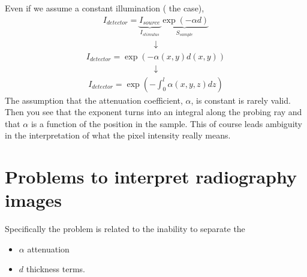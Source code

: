 \documentclass[letterpaper,10pt,english]{sphinxmanual}
\begin{document}
\sphinxAtStartPar
Even if we assume a constant illumination ( the case),
\begin{equation*}
\begin{split}I_{detector}=\underbrace{I_{source}}_{I_{stimulus}}\underbrace{\exp(-\alpha d)}_{S_{sample}}\end{split}
\end{equation*}\begin{equation*}
\begin{split}\downarrow\end{split}
\end{equation*}\begin{equation*}
\begin{split}I_{detector}=\exp(-\alpha(x,y) d(x,y))\end{split}
\end{equation*}\begin{equation*}
\begin{split}\downarrow\end{split}
\end{equation*}\begin{equation*}
\begin{split}I_{detector}=\exp\left(-\int_{0}^{l}\alpha(x,y, z) dz\right)\end{split}
\end{equation*}
\sphinxAtStartPar
The assumption that the attenuation coefficient, \(\alpha\), is constant is rarely valid. Then you see that the exponent turns into an integral along the probing ray and that \(\alpha\) is a function of the position in the sample. This of course leads ambiguity in the interpretation of what the pixel intensity really means.


\section{Problems to interpret radiography images}
\label{\detokenize{04-BasicSegmentation:problems-to-interpret-radiography-images}}
\sphinxAtStartPar
Specifically the problem is related to the inability to separate the
\begin{itemize}
\item {} 
\sphinxAtStartPar
\(\alpha\) \sphinxhyphen{} attenuation

\item {} 
\sphinxAtStartPar
\(d\) \sphinxhyphen{} thickness
terms.

\end{itemize}
\end{document}
